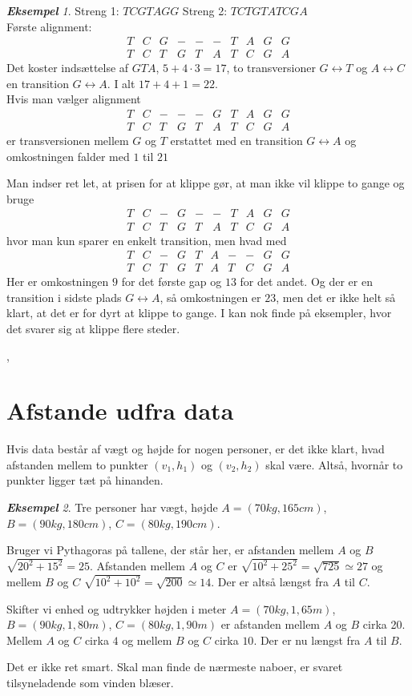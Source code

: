 \documentclass[a4paper, 12pt]{article}
\theoremstyle{remark}
\newtheorem{Eksempel}{\textbf{Eksempel}}
\begin{document}
\begin{Eksempel}
Streng 1: $TCGTAGG$ Streng 2: $TCTGTATCGA$
\\Første alignment:
$$\begin{matrix}T&C&G&-&-&-&T&A&G&G\\T&C&T&G&T&A&T&C&G&A\end{matrix}$$
Det koster indsættelse af $GTA$, $5+4\cdot 3=17$, to  transversioner $G\leftrightarrow T$ og $A\leftrightarrow C$ en transition $G\leftrightarrow A$. I alt $17+4+1=22$.\\
Hvis man vælger alignment 
$$\begin{matrix}T&C&-&-&-&G&T&A&G&G\\T&C&T&G&T&A&T&C&G&A\end{matrix}$$
er transversionen mellem $G$ og $T$ erstattet med en transition $G\leftrightarrow A$ og omkostningen falder med $1$ til $21$

Man indser ret let, at prisen for at klippe gør, at man ikke vil klippe to gange og  bruge 
$$\begin{matrix}T&C&-&G&-&-&T&A&G&G\\T&C&T&G&T&A&T&C&G&A\end{matrix}$$
hvor man kun sparer en enkelt transition, men hvad med 
$$\begin{matrix}T&C&-&G&T&A&-&-&G&G\\T&C&T&G&T&A&T&C&G&A\end{matrix}$$
Her er omkostningen $9$ for det første gap og $13$ for det andet. Og der er en transition i sidste plads $G\leftrightarrow A$, så omkostningen er $23$, men det er ikke helt så klart, at det er for dyrt at klippe to gange. I kan nok finde på eksempler, hvor det svarer sig at klippe flere steder. 
\end{Eksempel}, 



\section*{Afstande udfra data}
Hvis data består af vægt og højde for nogen personer, er det ikke klart, hvad afstanden mellem to punkter $(v_1,h_1)$ og $(v_2,h_2)$ skal være. Altså, hvornår to punkter ligger tæt på hinanden. 
\begin{Eksempel}
Tre personer har vægt, højde $A=(70 kg, 165 cm)$, $B=(90 kg, 180 cm)$, $C=(80 kg, 190 cm)$.

Bruger vi Pythagoras på tallene, der står her, er afstanden mellem $A$ og $B$ $\sqrt{20^2+15^2}=25$. Afstanden mellem $A$ og $C$ er $\sqrt{10^2+25^2}=\sqrt{725}\simeq 27$ og mellem $B$ og $C$ $\sqrt{10^2+10^2}=\sqrt{200}\simeq 14$. Der er altså længst fra $A$ til $C$.

Skifter vi enhed og udtrykker højden i meter $A=(70 kg, 1,\!65 m)$, $B=(90 kg, 1,\!80 m)$, $C=(80 kg, 1,\!90 m)$ er afstanden mellem $A$ og $B$ cirka 20. Mellem $A$ og $C$ cirka $4$ og mellem $B$ og $C$ cirka $10$. Der er nu længst fra $A$ til $B$.

Det er ikke ret smart. Skal man finde de nærmeste naboer, er svaret tilsyneladende som vinden blæser. 

\end{Eksempel}
\end{document}
